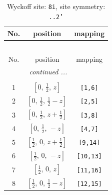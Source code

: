 \documentclass[fleqn,8pt]{jsarticle}
\begin{document}
\begin{longtable}{ccc}
\caption{Wyckoff site: {\tt 8i}, site symmetry: {\tt ..2'}}
 \\
 \hline \hline
No. & position & mapping \\ \hline \endfirsthead

\multicolumn{2}{l}{\tablename\ \thetable{}} \\
 \hline \hline
No. & position & mapping \\ \hline \endhead

 \hline \hline
\multicolumn{2}{r}{\footnotesize\it continued ...} \\ \endfoot

 \hline \hline
\multicolumn{2}{r}{} \\ \endlastfoot

1 & $\left[ 0,\, \frac{1}{2},\, z \right]$ & {\tt [1,6]} \\ \hline
2 & $\left[ 0,\, \frac{1}{2},\, \frac{1}{2} - z \right]$ & {\tt [2,5]} \\ \hline
3 & $\left[ 0,\, \frac{1}{2},\, z + \frac{1}{2} \right]$ & {\tt [3,8]} \\ \hline
4 & $\left[ 0,\, \frac{1}{2},\, - z \right]$ & {\tt [4,7]} \\ \hline
5 & $\left[ \frac{1}{2},\, 0,\, z + \frac{1}{2} \right]$ & {\tt [9,14]} \\ \hline
6 & $\left[ \frac{1}{2},\, 0,\, - z \right]$ & {\tt [10,13]} \\ \hline
7 & $\left[ \frac{1}{2},\, 0,\, z \right]$ & {\tt [11,16]} \\ \hline
8 & $\left[ \frac{1}{2},\, 0,\, \frac{1}{2} - z \right]$ & {\tt [12,15]} \\
\end{longtable}
\renewcommand{\arraystretch}{1.2}
\end{document}
